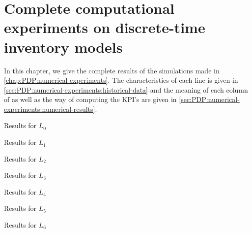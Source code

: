 \chapter{Complete computational experiments on discrete-time inventory models}
\label{chap:appendix:pdp:numerical-experiments}


In this chapter, we give the complete results of the simulations made in \cref{chap:PDP:numerical-experiments}.
The characteristics of each line is given in \cref{sec:PDP:numerical-experiments:historical-data} and the meaning of each column of  as well as the way of computing the KPI's are given in \cref{sec:PDP:numerical-experiments:numerical-results}.


\begin{table}[!ht]

\caption{Results for $L_0$}
\label{tab:appendix:pdp:results:line-0}
\end{table}

\begin{table}[!ht]

\caption{Results for $L_1$}
\label{tab:appendix:pdp:results:line-1}
\end{table}

\begin{table}[!ht]

\caption{Results for $L_2$}
\label{tab:appendix:pdp:results:line-2}
\end{table}

\begin{table}[!ht]

\caption{Results for $L_3$}
\label{tab:appendix:pdp:results:line-3}
\end{table}

\begin{table}[!ht]

\caption{Results for $L_4$}
\label{tab:appendix:pdp:results:line-4}
\end{table}

\begin{table}[!ht]

\caption{Results for $L_5$}
\label{tab:appendix:pdp:results:line-5}
\end{table}

\begin{table}[!ht]

\caption{Results for $L_6$}
\label{tab:appendix:pdp:results:line-6}
\end{table}

\newpage
